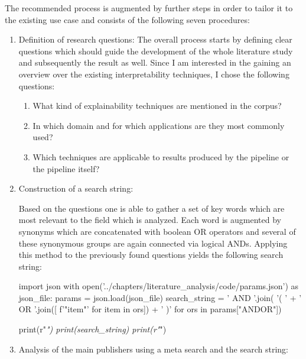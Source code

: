 The recommended process is augmented by further steps in order to tailor it to the existing use case and consists of the following seven procedures:
\begin{enumerate}
	
	\item Definition of research questions:
	The overall process starts by defining clear questions which should guide the development of the whole literature study and subsequently the result as well. Since I am interested in the gaining an overview over the existing interpretability techniques, I chose the following questions:
	
	\begin{enumerate}
		\item What kind of explainability techniques are mentioned in the corpus?
		\item In which domain and for which applications are they most commonly used?
		\item Which techniques are applicable to results produced by the pipeline or the pipeline itself? 
	\end{enumerate}
	
	\item Construction of a search string:
	
	Based on the questions one is able to gather a set of key words which are most relevant to the field which is analyzed. Each word is augmented by synonyms which are concatenated with boolean OR operators and several of these synonymous groups are again connected via logical ANDs. Applying this method to the previously found questions yields the following search string:
	
\begin{pycode}
import json
with open('../chapters/literature_analysis/code/params.json') as json_file:
	params = json.load(json_file)
	search_string = ' AND '.join( '( ' + ' OR '.join([ f'"{item}"' for item in ors]) + ' )' for ors in params["ANDOR"])
	
	print(r"\textit{")
	print(search_string)
	print(r"}")
\end{pycode}
	
	
	\item Analysis of the main publishers using a meta search and the search string:
	

\end{enumerate}
